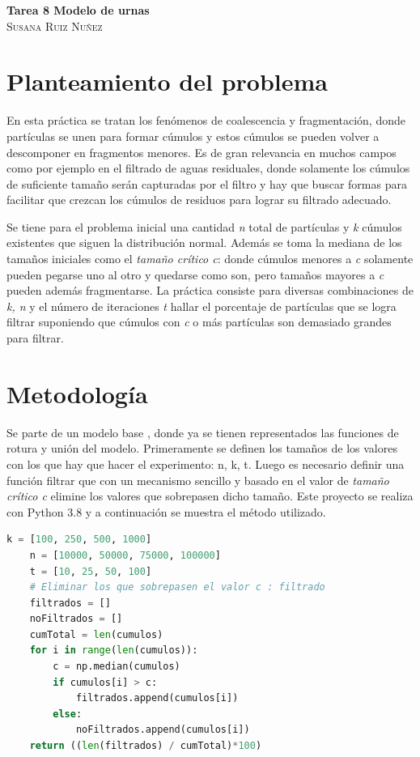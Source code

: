 \documentclass{article}
\begin{document}
	\begin{center}
	\huge{\textbf{Tarea 8 Modelo de urnas}}\\
	
	\textsc{ \Large Susana Ruiz Nuñez}
	\end{center}


\section{Planteamiento del problema} 
En esta práctica \cite{satu} se tratan los fenómenos de coalescencia y fragmentación, donde partículas se unen para formar cúmulos y estos cúmulos se pueden volver a descomponer en fragmentos menores. Es de gran relevancia en muchos campos como por ejemplo en el filtrado de aguas residuales, donde solamente los cúmulos de suficiente tamaño serán capturadas por el filtro y hay que buscar formas para facilitar que crezcan los cúmulos de residuos para lograr su filtrado adecuado.

Se tiene para el problema inicial una cantidad \textit{n} total de  partículas y \textit{k} cúmulos existentes que siguen la distribución normal. Además se toma la mediana de los tamaños iniciales como el \textit{tamaño crítico c}: donde cúmulos menores a \textit{c}  solamente pueden pegarse uno al otro y quedarse como son, pero tamaños mayores a \textit{c} pueden además fragmentarse. La práctica consiste para diversas combinaciones de \textit{k, n} y el número de iteraciones \textit{t} hallar el porcentaje de partículas que se logra filtrar suponiendo que cúmulos con \textit{c} o más partículas son demasiado grandes para filtrar. 

\section{Metodología}
Se parte de un modelo base \cite{satu}, donde ya se tienen representados las funciones de rotura y unión del modelo. Primeramente se definen los tamaños de los valores con los que hay que hacer el experimento: n, k, t. Luego es necesario definir una función filtrar que con un mecanismo sencillo y basado en el valor de \textit{tamaño crítico c} elimine los valores que sobrepasen dicho tamaño. Este proyecto se realiza con Python 3.8 y a continuación se muestra el método utilizado. 
  

\begin{lstlisting}[language=Python]
	k = [100, 250, 500, 1000]
	n = [10000, 50000, 75000, 100000]
	t = [10, 25, 50, 100]
	# Eliminar los que sobrepasen el valor c : filtrado
	filtrados = []
	noFiltrados = []
	cumTotal = len(cumulos)
	for i in range(len(cumulos)):
		c = np.median(cumulos)
		if cumulos[i] > c:
			filtrados.append(cumulos[i])
		else:
			noFiltrados.append(cumulos[i])
	return ((len(filtrados) / cumTotal)*100)
\end{lstlisting}
\end{document}
